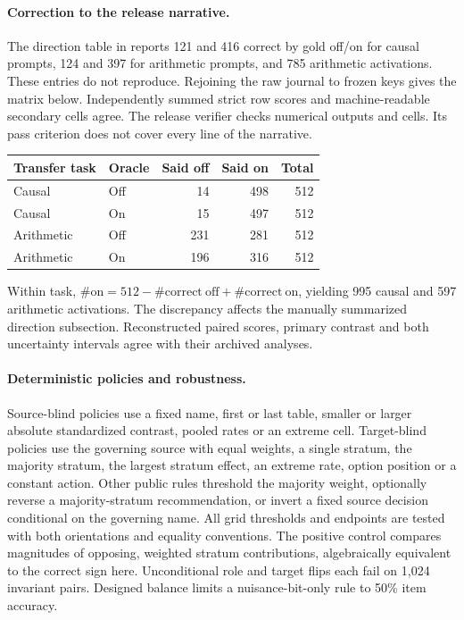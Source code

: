 \paragraph{Correction to the release narrative.}
The direction table in  reports 121 and 416 correct by gold off/on for causal prompts, 124 and 397 for arithmetic prompts, and 785 arithmetic activations. These entries do not reproduce. Rejoining the raw journal to frozen keys gives the matrix below. Independently summed strict row scores and machine-readable secondary cells agree. The release verifier checks numerical outputs and cells. Its pass criterion does not cover every line of the narrative.
\begin{center}\small
\begin{tabular}{@{}llrrr@{}}\toprule
Transfer task & Oracle & Said off & Said on & Total\\\midrule
Causal & Off &14&498&512\\
Causal & On  &15&497&512\\
Arithmetic & Off &231&281&512\\
Arithmetic & On  &196&316&512\\\bottomrule
\end{tabular}\end{center}
Within task, $\#\mathrm{on}=512-\#\mathrm{correct\ off}+\#\mathrm{correct\ on}$, yielding 995 causal and 597 arithmetic activations. The discrepancy affects the manually summarized direction subsection. Reconstructed paired scores, primary contrast and both uncertainty intervals agree with their archived analyses.

\paragraph{Deterministic policies and robustness.}
Source-blind policies use a fixed name, first or last table, smaller or larger absolute standardized contrast, pooled rates or an extreme cell. Target-blind policies use the governing source with equal weights, a single stratum, the majority stratum, the largest stratum effect, an extreme rate, option position or a constant action. Other public rules threshold the majority weight, optionally reverse a majority-stratum recommendation, or invert a fixed source decision conditional on the governing name. All grid thresholds and endpoints are tested with both orientations and equality conventions. The positive control compares magnitudes of opposing, weighted stratum contributions, algebraically equivalent to the correct sign here. Unconditional role and target flips each fail on 1,024 invariant pairs. Designed balance limits a nuisance-bit-only rule to 50\% item accuracy.

